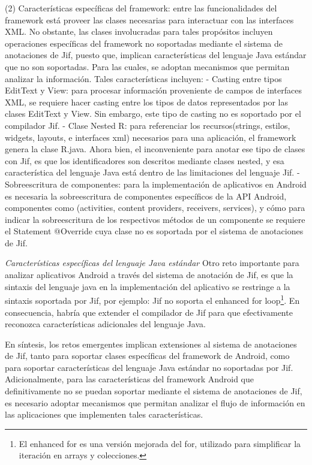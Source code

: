(2) Características específicas del framework: entre las funcionalidades del
framework está proveer las clases necesarias para interactuar con las interfaces
XML. No obstante, las clases involucradas para tales propósitos incluyen
operaciones específicas del framework no soportadas mediante el sistema de
anotaciones de Jif, puesto que, implican características del lenguaje Java
estándar que no son soportadas. Para las cuales, se adoptan mecanismos que
permitan analizar la información. Tales características incluyen:\newline 
- Casting entre tipos EditText y View: para procesar información proveniente de
campos de interfaces XML, se requiere hacer casting entre los tipos de datos representados por las clases EditText y
View. Sin embargo, este tipo de casting no es soportado por el compilador
Jif.\newline 
- Clase Nested R: para referenciar los
recursos(strings, estilos, widgets, layouts, e interfaces xml) necesarios para
una aplicación, el framework genera la clase R.java. Ahora bien, el
inconveniente para anotar ese tipo de clases con Jif, es que los identificadores
son descritos mediante clases nested, y esa característica del lenguaje Java
está dentro de las limitaciones del lenguaje Jif.\newline 
- Sobreescritura de componentes: para la implementación de aplicativos en Android es necesaria la
sobreescritura de componentes específicos de la API Android, componentes como
(activities, content providers, receivers, services), y cómo para indicar la
sobreescritura de los respectivos métodos de un componente se requiere el
Statement @Override cuya clase no es soportada por el sistema de anotaciones de
Jif.

\emph{Características específicas del lenguaje Java estándar}\newline
Otro reto importante para analizar aplicativos Android a través del sistema de
anotación de Jif, es que la sintaxis del lenguaje java en la implementación del
aplicativo se restringe a la sintaxis soportada por Jif, por ejemplo: Jif no
soporta el enhanced for loop\footnote{El enhanced for es una versión mejorada
del for, utilizado para simplificar la iteración en arrays y colecciones.}.
En consecuencia, habría que extender el compilador de Jif para que efectivamente reconozca características
adicionales del lenguaje Java.

En síntesis, los retos emergentes implican extensiones al sistema de
anotaciones de Jif, tanto para soportar clases específicas del framework de
Android, como para soportar características del lenguaje Java estándar no
soportadas por Jif.\newline
Adicionalmente, para las características del framework Android que
definitivamente no se puedan soportar mediante el sistema de anotaciones de Jif,
es necesario adoptar mecanismos que permitan analizar el flujo de información en
las aplicaciones que implementen tales características.\newline

